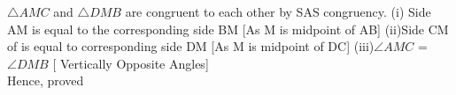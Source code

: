 
$\triangle AMC$ and $\triangle DMB$ are congruent to each other by SAS congruency.
\newline
(i) Side AM  is equal to the corresponding side BM  [As M is midpoint of AB]
\newline
(ii)Side CM of is equal to corresponding side DM [As M is midpoint of DC]
\newline
(iii)$\angle AMC$ = $\angle DMB$ [ Vertically Opposite Angles]
\\
Hence, proved

